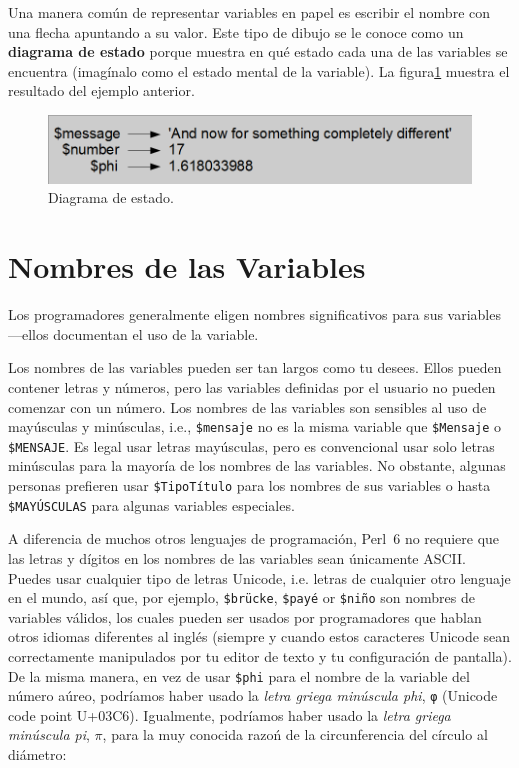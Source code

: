 Una manera común de representar variables en papel es escribir el 
nombre con una flecha apuntando a su valor. Este tipo de dibujo se le conoce
como un {\bf diagrama de estado} porque muestra en qué estado cada una de las variables
se encuentra (imagínalo como el estado mental de la variable).
La figura\ref{fig.state2} muestra el resultado del ejemplo anterior.

\begin{figure}
\centerline
{\includegraphics[scale=0.6]{figs/test_5.png}}
\caption{Diagrama de estado.}
\label{fig.state2}
\end{figure}



\section{Nombres de las Variables}

Los programadores generalmente eligen nombres significativos
para sus variables---ellos documentan el uso de la variable.

Los nombres de las variables pueden ser tan largos como tu desees.
Ellos pueden contener letras y números, pero las variables
definidas por el usuario no pueden comenzar con un número. Los nombres de las
variables son sensibles al uso de mayúsculas y minúsculas, 
i.e., {\tt \$mensaje} no es la misma variable que {\tt \$Mensaje} 
o {\tt \$MENSAJE}. Es legal usar letras mayúsculas, pero es convencional
usar solo letras minúsculas para la mayoría de los nombres de las
variables. No obstante, algunas personas prefieren usar {\tt \$TipoTítulo}
para los nombres de sus variables o hasta {\tt \$MAYÚSCULAS} 
para algunas variables especiales.


A diferencia de muchos otros lenguajes de programación, Perl~6 
no requiere que las letras y dígitos en los nombres de las variables
sean únicamente ASCII. Puedes usar cualquier tipo de letras Unicode, i.e.
letras de cualquier otro lenguaje en el mundo, así que, por ejemplo,
{\tt \$brücke}, {\tt \$payé} or {\tt \$niño} son nombres de variables
válidos, los cuales pueden ser usados por programadores que hablan 
otros idiomas diferentes al inglés (siempre y cuando estos caracteres
Unicode sean correctamente manipulados por tu editor de texto y tu
configuración de pantalla). De la misma manera, en vez de usar 
\verb"$phi" para el nombre de la variable del número aúreo,
podríamos haber usado la \emph{letra griega minúscula phi},
\verb'φ' (Unicode code point U+03C6). Igualmente, podríamos
haber usado la \emph{letra griega minúscula pi}, $\pi$, 
para la muy conocida razoń de la circunferencia del círculo
al diámetro:

